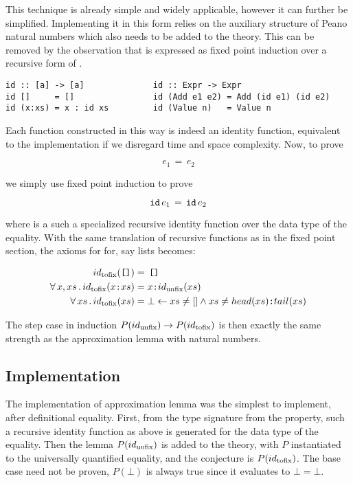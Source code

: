 This technique is already simple and widely applicable, however it can
further be simplified. Implementing it in this form relies on the
auxiliary structure of Peano natural numbers which also needs to be
added to the theory. This can be removed by the observation that is
expressed as fixed point induction over a recursive form of .

\begin{verbatim}
id :: [a] -> [a]              id :: Expr -> Expr
id []     = []                id (Add e1 e2) = Add (id e1) (id e2)
id (x:xs) = x : id xs         id (Value n)   = Value n
\end{verbatim}

Each  function constructed in this way is indeed an identity
function, equivalent to the implementation  if we
disregard time and space complexity. Now, to prove

\begin{equation*}
e_1 \, = \, e_2
\end{equation*}

we simply use fixed point induction to prove

\begin{equation*}
\hs{id} \, e_1 \, = \, \hs{id} \, e_2
\end{equation*}

where  is a such a specialized recursive identity function over
the data type of the equality. With the same translation of recursive
functions as in the fixed point section, the axioms for  for, say
lists becomes:

\begin{align*}
            \tofix{id}(\hs{[]})   & \eq \, \hs{[]}                                                           \\
\faa{x}{xs} \tofix{id}(x\hs{:}xs) & \eq x\hs{:}\unfix{id}(xs)                                                \\
\fa{xs}     \tofix{id}(xs)        & \eq \bot  \leftarrow    xs \neq [] \wedge xs \neq head(xs)\hs{:}tail(xs) \\
\end{align*}

The step case in induction $P(id_{\mathrm{unfix}}) \rightarrow P(id_{\mathrm{tofix}})$
is then exactly the same strength as the approximation lemma with
natural numbers.

\subsection{Implementation} The implementation of approximation lemma
was the simplest to implement, after definitional equality. First,
from the type signature from the property, such a recursive identity
function as above is generated for the data type of the equality. Then
the lemma $P(id_{\mathrm{unfix}})$ is added to the theory, with $P$
instantiated to the universally quantified equality, and the
conjecture is $P(id_{\mathrm{tofix}})$. The base case need not be proven,
$P(\bot)$ is always true since it evaluates to $\bot=\bot$.

